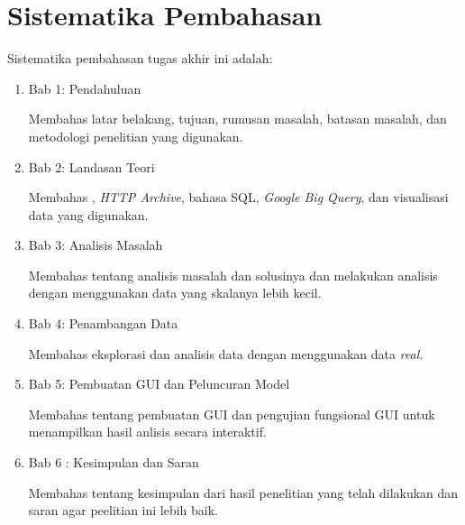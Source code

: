 \section{Sistematika Pembahasan}
\label{sec:sispem}
Sistematika pembahasan tugas akhir ini adalah:
\begin{enumerate}
    \item Bab 1: Pendahuluan
   
    Membahas latar belakang, tujuan, rumusan masalah, batasan masalah, dan metodologi penelitian yang digunakan.
    
    \item Bab 2: Landasan Teori

    Membahas \web, \textit{HTTP Archive}, bahasa SQL, \textit{Google Big Query}, dan visualisasi data yang digunakan.

    \item Bab 3: Analisis Masalah

    Membahas tentang analisis masalah dan solusinya dan melakukan analisis dengan menggunakan data yang skalanya lebih kecil.

    \item Bab 4: Penambangan Data
    
    Membahas eksplorasi dan analisis data dengan menggunakan data \textit{real}.

    \item Bab 5: Pembuatan GUI dan Peluncuran Model

    Membahas tentang pembuatan GUI dan pengujian fungsional GUI untuk menampilkan hasil anlisis secara interaktif.

    \item Bab 6 : Kesimpulan dan Saran

    Membahas tentang kesimpulan dari hasil penelitian yang telah dilakukan dan saran agar peelitian ini lebih baik.
\end{enumerate}

